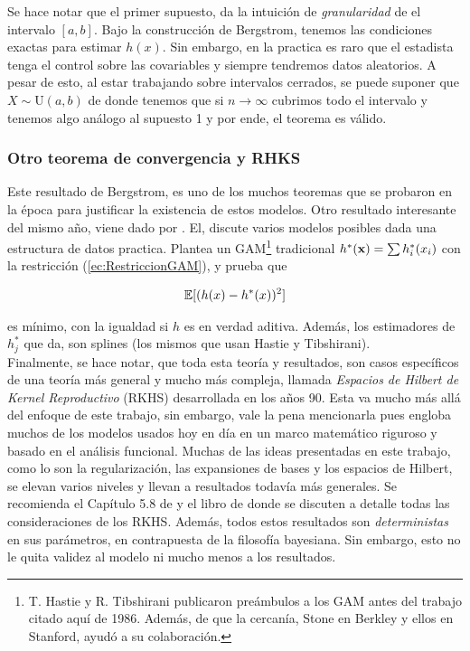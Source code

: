 \documentclass[../Main/Main.tex]{subfiles}
\begin{document}
Se hace notar que el primer supuesto, da la intuición de \textit{granularidad} de el intervalo $[a,b]$. Bajo la construcción de Bergstrom, tenemos las condiciones exactas para estimar $h(x)$. Sin embargo, en la practica es raro que el estadista tenga el control sobre las covariables y siempre tendremos datos aleatorios. A pesar de esto, al estar trabajando sobre intervalos cerrados, se puede suponer que $X \sim \text{U}(a,b)$ de donde tenemos que si $n\to\infty$ cubrimos todo el intervalo y tenemos algo análogo al supuesto 1 y por ende, el teorema es válido. 

\subsubsection*{Otro teorema de convergencia y RHKS}

Este resultado de Bergstrom, es uno de los muchos teoremas que se probaron en la época para justificar la existencia de estos modelos. Otro resultado interesante del mismo año, viene dado por \autocite{stone1985additive}. El, discute varios modelos posibles dada una estructura de datos practica. Plantea un GAM\footnote{T. Hastie y R. Tibshirani publicaron preámbulos a los GAM antes del trabajo citado aquí de 1986. Además, de que la cercanía, Stone en Berkley y ellos en Stanford, ayudó a su colaboración.} tradicional $h^*(\mathbf{x}) = \sum h_i^*(x_i)$ con la restricción (\ref{ec:RestriccionGAM}), y prueba que

\begin{align*}
	\mathbb{E}[(h(x) - h^*(x))^2] 
\end{align*}

es mínimo, con la igualdad si $h$ es en verdad aditiva. Además, los estimadores de $h_j^*$ que da, son splines (los mismos que usan Hastie y Tibshirani).\\

Finalmente, se hace notar, que toda esta teoría y resultados, son casos específicos de una teoría más general y mucho más compleja, llamada \textit{Espacios de Hilbert de Kernel Reproductivo} (RKHS) desarrollada en los años 90. Esta va mucho más allá del enfoque de este trabajo, sin embargo, vale la pena mencionarla pues engloba muchos de los modelos usados hoy en día en un marco matemático riguroso y basado en el análisis funcional. Muchas de las ideas presentadas en este trabajo, como lo son la regularización, las expansiones de bases y los espacios de Hilbert, se elevan varios niveles y llevan a resultados todavía más generales. Se recomienda el Capítulo 5.8 de \autocite{hastie2008elements} y el libro de \autocite{wahba1990splines} donde se discuten a detalle todas las consideraciones de los RKHS. Además, todos estos resultados son \textit{deterministas} en sus parámetros, en contrapuesta de la filosofía bayesiana. Sin embargo, esto no le quita validez al modelo ni mucho menos a los resultados. 

\end{document}
